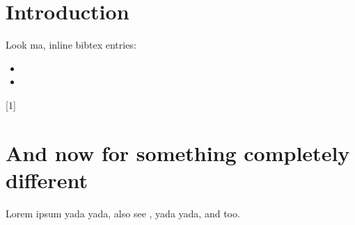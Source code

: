 \documentclass{article}
\begin{document}
 
\section{Introduction}
 
Look ma, inline bibtex entries:
 
\begin{itemize}
\item {}
\item {}
\end{itemize}
[1]
 
\section{And now for something completely different}
Lorem ipsum yada yada,
also see \cite{wiki}, 
yada yada, and \cite{Health} too.
 


 
\end{document}
